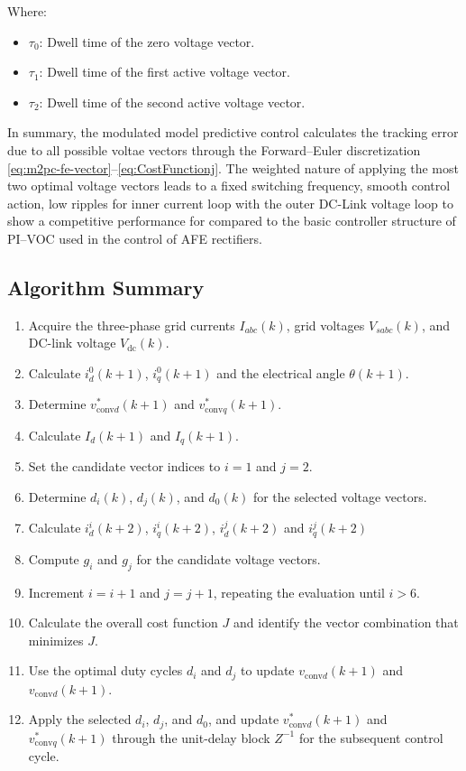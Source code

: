 \noindent Where:
\begin{itemize}
	\item $\tau_0$: Dwell time of the zero voltage vector.
  \item $\tau_1$: Dwell time of the first active voltage vector.
  \item $\tau_2$: Dwell time of the second active voltage vector. 
\end{itemize}

In summary, the modulated model predictive control calculates the tracking error due to all possible voltae vectors through the Forward–Euler discretization \eqref{eq:m2pc-fe-vector}–\eqref{eq:CostFunctionj}. The weighted nature of applying the most two optimal voltage vectors leads to a fixed switching frequency, smooth control action, low ripples for inner current loop with the outer DC-Link voltage loop to show a competitive performance for compared to the basic controller structure of PI–VOC used in the control of AFE rectifiers.

\newpage
\subsection{Algorithm Summary}
\begin{enumerate}
  \item Acquire the three-phase grid currents $I_{abc}(k)$, grid voltages $V_{sabc}(k)$, and DC-link voltage $V_{\mathrm{dc}}(k)$.
  \item Calculate $i^{0}_{d}(k+1)$, $i^{0}_{q}(k+1)$ and the electrical angle $\theta(k+1)$.
  \item Determine $v^{*}_{\mathrm{conv}d}(k+1)$ and $v^{*}_{\mathrm{conv}q}(k+1)$.
  \item Calculate $I_d(k+1)$ and $I_q(k+1)$.
  \item Set the candidate vector indices to $i=1$ and $j=2$.
  \item Determine $d_i(k)$, $d_j(k)$, and $d_0(k)$ for the selected voltage vectors.
  \item Calculate $i^{i}_{d}(k+2)$, $i^{i}_{q}(k+2)$, $i^{j}_{d}(k+2)$ and $i^{j}_{q}(k+2)$
  \item Compute $g_i$ and $g_j$ for the candidate voltage vectors.
  \item Increment $i=i+1$ and $j=j+1$, repeating the evaluation until $i>6$.
  \item Calculate the overall cost function $J$ and identify the vector combination that minimizes $J$.
  \item Use the optimal duty cycles $d_i$ and $d_j$ to update $v_{\mathrm{conv}d}(k+1)$ and $v_{\mathrm{conv}d}(k+1)$.
  \item Apply the selected $d_i$, $d_j$, and $d_0$, and update $v^{*}_{\mathrm{conv}d}(k+1)$ and $v^{*}_{\mathrm{conv}q}(k+1)$ through the unit-delay block $Z^{-1}$ for the subsequent control cycle.
\end{enumerate}

